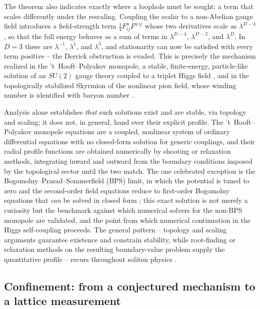 \documentclass[11pt]{article}
\begin{document}
The theorem also indicates exactly where a loophole must be sought: a term that scales differently under the rescaling. Coupling the scalar to a non-Abelian gauge field introduces a field-strength term $\tfrac{1}{4}F_{ij}^aF^{a\,ij}$ whose two derivatives scale as $\lambda^{D-4}$, so that the full energy behaves as a sum of terms in $\lambda^{D-4}$, $\lambda^{D-2}$, and $\lambda^D$. In $D=3$ these are $\lambda^{-1}$, $\lambda^{1}$, and $\lambda^{3}$, and stationarity can now be satisfied with every term positive -- the Derrick obstruction is evaded. This is precisely the mechanism realized in the 't~Hooft--Polyakov monopole, a stable, finite-energy, particle-like solution of an $SU(2)$ gauge theory coupled to a triplet Higgs field \cite{Hooft1974}, and in the topologically stabilized Skyrmion of the nonlinear pion field, whose winding number is identified with baryon number \cite{Skyrme1962}.

Analysis alone establishes \emph{that} such solutions exist and are stable, via topology and scaling; it does not, in general, hand over their explicit profile. The 't~Hooft--Polyakov monopole equations are a coupled, nonlinear system of ordinary differential equations with no closed-form solution for generic couplings, and their radial profile functions are obtained numerically by shooting or relaxation methods, integrating inward and outward from the boundary conditions imposed by the topological sector until the two match. The one celebrated exception is the Bogomolny--Prasad--Sommerfield (BPS) limit, in which the potential is tuned to zero and the second-order field equations reduce to first-order Bogomolny equations that \emph{can} be solved in closed form \cite{PrasadSommerfield1975}; this exact solution is not merely a curiosity but the benchmark against which numerical solvers for the non-BPS monopole are validated, and the point from which numerical continuation in the Higgs self-coupling proceeds. The general pattern -- topology and scaling arguments guarantee existence and constrain stability, while root-finding or relaxation methods on the resulting boundary-value problem supply the quantitative profile -- recurs throughout soliton physics \cite{MantonSutcliffe2004}.

\subsection{Confinement: from a conjectured mechanism to a lattice measurement}
\end{document}
